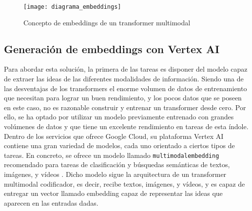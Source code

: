 			\begin{figure}[!h]
				\centering
				\texttt{[image: diagrama\_embeddings]}
				\caption{Concepto de embeddings de un transformer multimodal}
				\label{fig:diagrama_embeddings}
			\end{figure}
			
			\subsection{Generación de embeddings con Vertex AI}
			
				Para abordar esta solución, la primera de las tareas es disponer del modelo capaz de extraer las ideas de las diferentes modalidades de información. Siendo una de las desventajas de los transformers el enorme volumen de datos de entrenamiento que necesitan para lograr un buen rendimiento, y los pocos datos que se poseen en este caso, no es razonable construir y entrenar un transformer desde cero. Por ello, se ha optado por utilizar un modelo previamente entrenado con grandes volúmenes de datos y que tiene un excelente rendimiento en tareas de esta índole. Dentro de los servicios que ofrece Google Cloud, su plataforma Vertex AI contiene una gran variedad de modelos, cada uno orientado a ciertos tipos de tareas. En concreto, se ofrece un modelo llamado \texttt{multimodalembedding} recomendado para tareas de clasificación y búsquedas semánticas de textos, imágenes, y vídeos \cite{vertex}. Dicho modelo sigue la arquitectura de un transformer multimodal codificador, es decir, recibe textos, imágenes, y vídeos, y es capaz de entregar un vector llamado embedding capaz de representar las ideas que aparecen en las entradas dadas. \\
				
